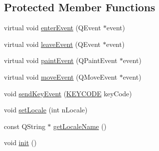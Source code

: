 \subsection*{Protected Member Functions}
\begin{DoxyCompactItemize}
\item 
virtual void \hyperlink{class_u_b_keyboard_palette_aae4678e17eafebc83dfb4b1abaf72d04}{enter\-Event} (Q\-Event $\ast$event)
\item 
virtual void \hyperlink{class_u_b_keyboard_palette_a73a6cbd3a4e6d1318bd8ee30636249df}{leave\-Event} (Q\-Event $\ast$event)
\item 
virtual void \hyperlink{class_u_b_keyboard_palette_ae1f571abb2fd626d7263fdfce9d52261}{paint\-Event} (Q\-Paint\-Event $\ast$event)
\item 
virtual void \hyperlink{class_u_b_keyboard_palette_a54509a0865871f992c417e36b3f4a5c2}{move\-Event} (Q\-Move\-Event $\ast$event)
\item 
void \hyperlink{class_u_b_keyboard_palette_a7082d7c1cdb375d64cc7abb1bf685888}{send\-Key\-Event} (\hyperlink{struct_k_e_y_c_o_d_e}{K\-E\-Y\-C\-O\-D\-E} key\-Code)
\item 
void \hyperlink{class_u_b_keyboard_palette_a1ba61c64765f152c7a9c443b91a8b169}{set\-Locale} (int n\-Locale)
\item 
const Q\-String $\ast$ \hyperlink{class_u_b_keyboard_palette_aaafc7f05ad6c2b4f63eaf553174e0ab6}{get\-Locale\-Name} ()
\item 
void \hyperlink{class_u_b_keyboard_palette_a17a1566aada47c89954068f3bcbd4e2d}{init} ()
\end{DoxyCompactItemize}
